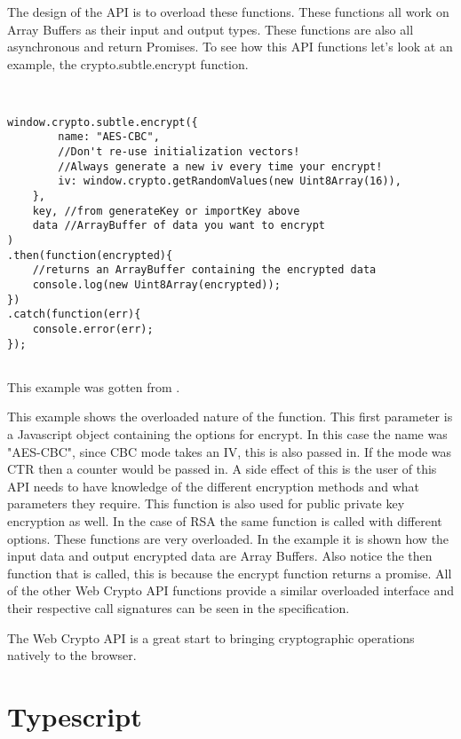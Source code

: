 The design of the API is to overload these functions. These functions all work on Array Buffers as their input and output types. These functions are also all asynchronous and return Promises. To see how this API functions let's look at an example, the crypto.subtle.encrypt function.


\begin{lstlisting}


window.crypto.subtle.encrypt({
        name: "AES-CBC",
        //Don't re-use initialization vectors!
        //Always generate a new iv every time your encrypt!
        iv: window.crypto.getRandomValues(new Uint8Array(16)),
    },
    key, //from generateKey or importKey above
    data //ArrayBuffer of data you want to encrypt
)
.then(function(encrypted){
    //returns an ArrayBuffer containing the encrypted data
    console.log(new Uint8Array(encrypted));
})
.catch(function(err){
    console.error(err);
});


\end{lstlisting}


This example was gotten from \cite{aes-example}.


This example shows the overloaded nature of the function. This first parameter is a Javascript object containing the options for encrypt. In this case the name was "AES-CBC", since CBC mode takes an IV, this is also passed in. If the mode was CTR then a counter would be passed in. A side effect of this is the user of this API needs to have knowledge of the different encryption methods and what parameters they require. This function is also used for public private key encryption as well. In the case of RSA the same function is called with different options. These functions are very overloaded. In the example it is shown how the input data and output encrypted data are Array Buffers. Also notice the then function that is called, this is because the encrypt function returns a promise. All of the other Web Crypto API functions provide a similar overloaded interface and their respective call signatures can be seen in the specification.\cite{webcrypto-overview}


The Web Crypto API is a great start to bringing cryptographic operations natively to the browser.


\section{Typescript}


